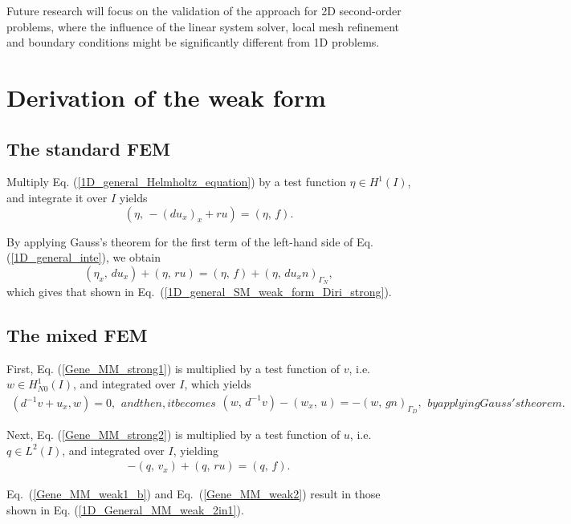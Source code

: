 \documentclass[review,3p]{elsarticle}
\begin{document}
Future research will focus on the validation of the approach for 2D second-order problems, where the influence of the linear system solver, local mesh refinement and boundary conditions might be significantly different from 1D problems. 

\appendix

\section{Derivation of the weak form}		\label{weak form appendix}

\subsection{The standard FEM}		\label{derivation_weak_form_SM}

Multiply Eq. (\ref{1D_general_Helmholtz_equation}) by a test function $\eta \in H ^1 (I)$, and integrate it over $I$ yields
\begin{equation}
(\eta, \, -\left(d u_x \right)_x + ru) = (\eta, \, f). \label{1D_general_inte}
\end{equation}

By applying Gauss's theorem for the first term of the left-hand side of Eq. (\ref{1D_general_inte}), we obtain
\begin{equation}
 ({\eta} _x, \, d u_x) + (\eta, \, ru) = (\eta, \, f) + \left( \eta, \, d u_x n \right)_{ {\Gamma_N}},		\label{1D_general_gauss}
\end{equation}
which gives that shown in Eq.~({\ref{1D_general_SM_weak_form_Diri_strong}}).

\subsection{The mixed FEM}		\label{derivation_weak_form_MM}
First, Eq. (\ref{Gene_MM_strong1}) is multiplied by a test function of $v$, i.e. $w \in H _{N0}^{1}(I)$, and integrated over $I$, which yields
\begin{subequations}
\begin{align}
  ( d^{-1}v + u _x, w) = 0,	\label{Gene_MM_weak1_a}
\end{align}
and then, it becomes
\begin{align}
 (w, \, d^{-1}v) - (w_x, \,  u ) = -(w, \, g n)_{\Gamma_D},		\label{Gene_MM_weak1_b}
\end{align}				\label{Gene_MM_weak1}%
by applying Gauss's theorem.
\end{subequations}

Next, Eq. (\ref{Gene_MM_strong2}) is multiplied by a test function of $u$, i.e. $q \in L^2 (I)$, and integrated over $I$, yielding 
\begin{align}
- ( q , \, v_x) + (q, \, ru) = (q, \, f ). \label{Gene_MM_weak2}
\end{align}

Eq.~(\ref{Gene_MM_weak1_b}) and Eq.~({\ref{Gene_MM_weak2}}) result in those shown in Eq. (\ref{1D_General_MM_weak_2in1}).

\newpage

  
\end{document}
